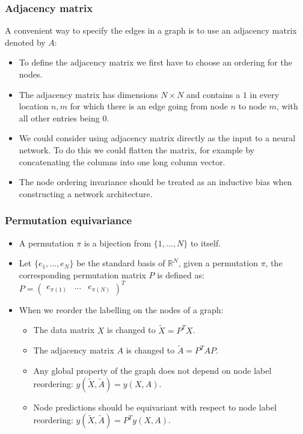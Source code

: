 \documentclass{beamer}
\begin{document}
\begin{frame}
    \frametitle{Adjacency matrix}
    A convenient way to specify the edges in a graph is to use an adjacency matrix denoted by $A$:
    \begin{itemize}
        \item To define the adjacency matrix we first have to choose an ordering for the nodes.
        \item The adjacency matrix has dimensions $N\times{}N$ and contains a $1$ in every location $n,m$ for which there is an edge going from node $n$ to node $m$, with all other entries being $0$.
        \item We could consider using adjacency matrix directly as the input to a neural network. To do this we could flatten the matrix, for example by concatenating the columns into one long column vector.
        \item The node ordering invariance should be treated as an inductive bias when constructing a network architecture.
    \end{itemize}
\end{frame}

\begin{frame}
    \frametitle{Permutation equivariance}
    \begin{itemize}
        \item A permutation $\pi$ is a bijection from $\{1,\hdots,N\}$ to itself.
        \item Let $\{e_{1},\hdots,e_{N}\}$ be the standard basis of $\mathbb{R}^{N}$, given a permutation $\pi$, the corresponding permutation matrix $P$ is defined as: $P=\begin{pmatrix}
            e_{\pi(1)}&\hdots&e_{\pi(N)}
        \end{pmatrix}^{T}$
        \item When we reorder the labelling on the nodes of a graph:
        \begin{itemize}
            \item The data matrix $X$ is changed to $\tilde{X}=P^{T}X$.
            \item The adjacency matrix $A$ is changed to $\tilde{A}=P^{T}AP$.
            \item Any global property of the graph does not depend on node label reordering: $y(\tilde{X},\tilde{A})=y(X,A)$.
            \item Node predictions should be equivariant with respect to node label reordering: $y(\tilde{X},\tilde{A})=P^{T}y(X,A)$.
        \end{itemize}
    \end{itemize}
\end{frame}
\end{document}
